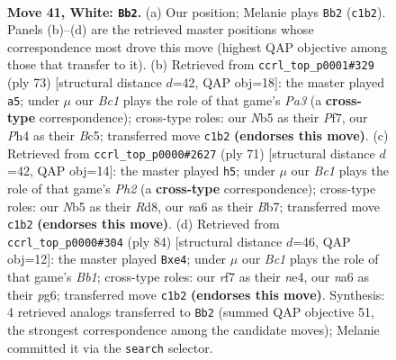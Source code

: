 \documentclass[11pt]{article}
\begin{document}
\clearpage

\begin{figure}[p]\centering
\begin{subfigure}{0.46\textwidth}\centering
\resizebox{\linewidth}{!}{%
\newchessgame
\chessboard[
  setfen={5k2/1p2pr1p/n5p1/pNp5/5P1P/2P2P2/P2R4/n1B2K2 w - - 7 41},
  showmover=false,
  pgfstyle=straightmove, color=movearrow, markmove={c1-b2}
]}
\caption{}
\end{subfigure}\hfill
\begin{subfigure}{0.46\textwidth}\centering
\resizebox{\linewidth}{!}{%
\newchessgame
\chessboard[
  setfen={5k2/5p2/p3p2p/2b1P2P/2p2P2/2P2K2/1PRN4/r7 b - - 3 37},
  showmover=false,
  pgfstyle=straightmove, color=movearrow, markmove={a6-a5}
]}
\caption{}
\end{subfigure}
\\[4pt]
\begin{subfigure}{0.46\textwidth}\centering
\resizebox{\linewidth}{!}{%
\newchessgame
\chessboard[
  setfen={3r3k/1b3p1p/2r5/P3p3/2p1P2P/2N1N1P1/1P3P2/1R4K1 b - - 4 36},
  showmover=false,
  pgfstyle=straightmove, color=movearrow, markmove={h7-h5}
]}
\caption{}
\end{subfigure}\hfill
\begin{subfigure}{0.46\textwidth}\centering
\resizebox{\linewidth}{!}{%
\newchessgame
\chessboard[
  setfen={8/p3rp2/1p3kp1/1P5p/4n2P/4P3/R4PPK/1B6 w - - 13 43},
  showmover=false,
  pgfstyle=straightmove, color=movearrow, markmove={b1-e4}
]}
\caption{}
\end{subfigure}
\caption{\textbf{Move 41, White: \texttt{Bb2}.} (a) Our position; Melanie plays \texttt{Bb2} (\texttt{c1b2}). Panels (b)--(d) are the retrieved master positions whose correspondence most drove this move (highest QAP objective among those that transfer to it). (b) Retrieved from \texttt{ccrl\_top\_p0001\#329} (ply 73) [structural distance $d$=42, QAP obj=18]: the master played \texttt{a5}; under $\mu$ our \emph{Bc1} plays the role of that game's \emph{Pa3} (a \textbf{cross-type} correspondence); cross-type roles: our \emph{N}b5 as their \emph{P}f7, our \emph{P}h4 as their \emph{B}c5; transferred move \texttt{c1b2} \textbf{(endorses this move)}. (c) Retrieved from \texttt{ccrl\_top\_p0000\#2627} (ply 71) [structural distance $d$=42, QAP obj=14]: the master played \texttt{h5}; under $\mu$ our \emph{Bc1} plays the role of that game's \emph{Ph2} (a \textbf{cross-type} correspondence); cross-type roles: our \emph{N}b5 as their \emph{R}d8, our \emph{n}a6 as their \emph{B}b7; transferred move \texttt{c1b2} \textbf{(endorses this move)}. (d) Retrieved from \texttt{ccrl\_top\_p0000\#304} (ply 84) [structural distance $d$=46, QAP obj=12]: the master played \texttt{Bxe4}; under $\mu$ our \emph{Bc1} plays the role of that game's \emph{Bb1}; cross-type roles: our \emph{r}f7 as their \emph{n}e4, our \emph{n}a6 as their \emph{p}g6; transferred move \texttt{c1b2} \textbf{(endorses this move)}. Synthesis: 4 retrieved analogs transferred to \texttt{Bb2} (summed QAP objective 51, the strongest correspondence among the candidate moves); Melanie committed it via the \texttt{search} selector.}
\label{fig:thought-m80}
\end{figure}
\end{document}
